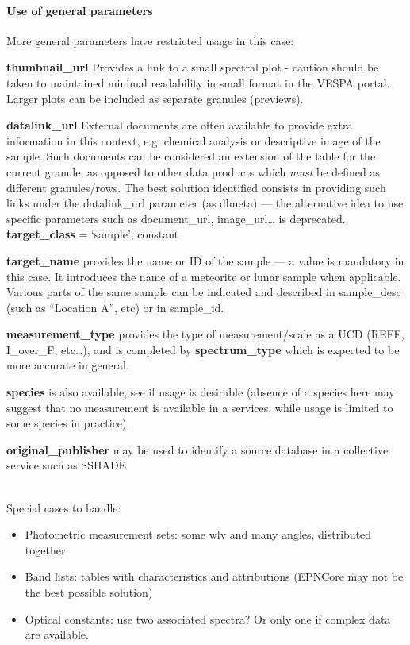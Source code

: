 \documentclass[11pt,a4paper]{ivoa}
\begin{document}
\paragraph{Use of general parameters}

More general parameters have restricted usage in this case:

\textbf{thumbnail\_url }Provides a link to a small spectral plot -
caution should be taken to maintained minimal readability in small format
in the VESPA portal. Larger plots can be included as separate granules
(previews).

\textbf{datalink\_url} External documents are often available to provide
extra information in this context, e.g. chemical analysis or descriptive
image of the sample. Such documents can be considered an extension of the
table for the current granule, as opposed to other data products which
\emph{must} be defined as different granules/rows. The best solution
identified consists in providing such links under the datalink\_url
parameter (as dlmeta)  --- the alternative idea to use specific parameters
such as document\_url, image\_url… is deprecated.\\

\textbf{target\_class }= `sample', constant

\textbf{target\_name }provides the name or ID of the sample — a value
is mandatory in this case. It introduces the name of a meteorite or
lunar sample when applicable. Various parts of the same sample can be
indicated and described in sample\_desc (such as ``Location A'', etc)
or in sample\_id.

\textbf{measurement\_type} provides the type of measurement/scale as a UCD
(REFF, I\_over\_F, etc…), and is completed by \textbf{spectrum\_type}
which is expected to be more accurate in general.

\textbf{species} is also available, see if usage is desirable (absence of
a species here may suggest that no measurement is available in a services,
while usage is limited to some species in practice).

\textbf{original\_publisher }may be used to identify a source database
in a collective service such as SSHADE


\textbf{\\}
Special cases to handle:

\begin{itemize}
\item Photometric measurement sets: some wlv and many angles,
distributed together
\item Band lists: tables with characteristics and attributions
(EPNCore may not be the best possible solution)
\item Optical constants: use two associated spectra?
Or only one if complex data are available.
\end{itemize}
\end{document}
